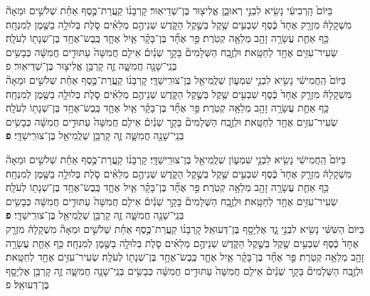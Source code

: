\documentclass[twoside, openany, parskip=half, 11pt]{book}
\begin{document}
\begin{footnotesize}
\begin{multicols}{2}
בַּיּוֹם֙ הָֽרְבִיעִ֔י נָשִׂ֖יא לִבְנֵ֣י רְאוּבֵ֑ן אֱלִיצ֖וּר בֶּן־שְׁדֵיאֽוּר׃ קָרְבָּנ֜וֹ קַֽעֲרַת־כֶּ֣סֶף אַחַ֗ת שְׁלֹשִׁ֣ים וּמֵאָה֘ מִשְׁקָלָהּ֒ מִזְרָ֤ק אֶחָד֙ כֶּ֔סֶף שִׁבְעִ֥ים שֶׁ֖קֶל בְּשֶׁ֣קֶל הַקֹּ֑דֶשׁ שְׁנֵיהֶ֣ם מְלֵאִ֗ים סֹ֛לֶת בְּלוּלָ֥ה בַשֶּׁ֖מֶן לְמִנְחָֽה׃ כַּ֥ף אַחַ֛ת עֲשָׂרָ֥ה זָהָ֖ב מְלֵאָ֥ה קְטֹֽרֶת׃   פַּ֣ר אֶחָ֞ד בֶּן־בָּקָ֗ר אַ֧יִל אֶחָ֛ד כֶּֽבֶשׂ־אֶחָ֥ד בֶּן־שְׁנָת֖וֹ לְעֹלָֽה׃ שְׂעִיר־עִזִּ֥ים אֶחָ֖ד לְחַטָּֽאת׃ וּלְזֶ֣בַֽח הַשְּׁלָמִים֘ בָּקָ֣ר שְׁנַ֒יִם֒ אֵילִ֤ם חֲמִשָּׁה֙ עַתּוּדִ֣ים חֲמִשָּׁ֔ה כְּבָשִׂ֥ים בְּנֵֽי־שָׁנָ֖ה חֲמִשָּׁ֑ה זֶ֛ה קָרְבַּ֥ן אֱלִיצ֖וּר בֶּן־שְׁדֵיאֽוּר׃ פ\\
  בַּיּוֹם֙ הַֽחֲמִישִׁ֔י נָשִׂ֖יא לִבְנֵ֣י שִׁמְע֑וֹן שְׁלֻֽמִיאֵ֖ל בֶּן־צוּרִֽישַׁדָּֽי׃ קָרְבָּנ֜וֹ קַֽעֲרַת־כֶּ֣סֶף אַחַ֗ת שְׁלֹשִׁ֣ים וּמֵאָה֘ מִשְׁקָלָהּ֒ מִזְרָ֤ק אֶחָד֙ כֶּ֔סֶף שִׁבְעִ֥ים שֶׁ֖קֶל בְּשֶׁ֣קֶל הַקֹּ֑דֶשׁ שְׁנֵיהֶ֣ם מְלֵאִ֗ים סֹ֛לֶת בְּלוּלָ֥ה בַשֶּׁ֖מֶן לְמִנְחָֽה׃ כַּ֥ף אַחַ֛ת עֲשָׂרָ֥ה זָהָ֖ב מְלֵאָ֥ה קְטֹֽרֶת׃ פַּ֣ר אֶחָ֞ד בֶּן־בָּקָ֗ר אַ֧יִל אֶחָ֛ד כֶּֽבֶשׂ־אֶחָ֥ד בֶּן־שְׁנָת֖וֹ לְעֹלָֽה׃ שְׂעִיר־עִזִּ֥ים אֶחָ֖ד לְחַטָּֽאת׃ וּלְזֶ֣בַֽח הַשְּׁלָמִים֘ בָּקָ֣ר שְׁנַ֒יִם֒ אֵילִ֤ם חֲמִשָּׁה֙ עַתּוּדִ֣ים חֲמִשָּׁ֔ה כְּבָשִׂ֥ים בְּנֵֽי־שָׁנָ֖ה חֲמִשָּׁ֑ה זֶ֛ה קָרְבַּ֥ן שְׁלֻֽמִיאֵ֖ל בֶּן־צוּרִֽישַׁדָּֽי׃ \textbf{פ}  


בַּיּוֹם֙ הַֽחֲמִישִׁ֔י נָשִׂ֖יא לִבְנֵ֣י שִׁמְע֑וֹן שְׁלֻֽמִיאֵ֖ל בֶּן־צוּרִֽישַׁדָּֽי׃ קָרְבָּנ֜וֹ קַֽעֲרַת־כֶּ֣סֶף אַחַ֗ת שְׁלֹשִׁ֣ים וּמֵאָה֘ מִשְׁקָלָהּ֒ מִזְרָ֤ק אֶחָד֙ כֶּ֔סֶף שִׁבְעִ֥ים שֶׁ֖קֶל בְּשֶׁ֣קֶל הַקֹּ֑דֶשׁ שְׁנֵיהֶ֣ם מְלֵאִ֗ים סֹ֛לֶת בְּלוּלָ֥ה בַשֶּׁ֖מֶן לְמִנְחָֽה׃ כַּ֥ף אַחַ֛ת עֲשָׂרָ֥ה זָהָ֖ב מְלֵאָ֥ה קְטֹֽרֶת׃   פַּ֣ר אֶחָ֞ד בֶּן־בָּקָ֗ר אַ֧יִל אֶחָ֛ד כֶּֽבֶשׂ־אֶחָ֥ד בֶּן־שְׁנָת֖וֹ לְעֹלָֽה׃ שְׂעִיר־עִזִּ֥ים אֶחָ֖ד לְחַטָּֽאת׃ וּלְזֶ֣בַֽח הַשְּׁלָמִים֘ בָּקָ֣ר שְׁנַ֒יִם֒ אֵילִ֤ם חֲמִשָּׁה֙ עַתּוּדִ֣ים חֲמִשָּׁ֔ה כְּבָשִׂ֥ים בְּנֵֽי־שָׁנָ֖ה חֲמִשָּׁ֑ה זֶ֛ה קָרְבַּ֥ן שְׁלֻֽמִיאֵ֖ל בֶּן־צוּרִֽישַׁדָּֽי׃ \textbf{פ} \\ 
  בַּיּוֹם֙ הַשִּׁשִּׁ֔י נָשִׂ֖יא לִבְנֵ֣י גָ֑ד אֶלְיָסָ֖ף בֶּן־דְּעוּאֵֽל׃ קָרְבָּנ֜וֹ קַֽעֲרַת־כֶּ֣סֶף אַחַ֗ת שְׁלֹשִׁ֣ים וּמֵאָה֘ מִשְׁקָלָהּ֒ מִזְרָ֤ק אֶחָד֙ כֶּ֔סֶף שִׁבְעִ֥ים שֶׁ֖קֶל בְּשֶׁ֣קֶל הַקֹּ֑דֶשׁ שְׁנֵיהֶ֣ם מְלֵאִ֗ים סֹ֛לֶת בְּלוּלָ֥ה בַשֶּׁ֖מֶן לְמִנְחָֽה׃ כַּ֥ף אַחַ֛ת עֲשָׂרָ֥ה זָהָ֖ב מְלֵאָ֥ה קְטֹֽרֶת׃ פַּ֣ר אֶחָ֞ד בֶּן־בָּקָ֗ר אַ֧יִל אֶחָ֛ד כֶּֽבֶשׂ־אֶחָ֥ד בֶּן־שְׁנָת֖וֹ לְעֹלָֽה׃ שְׂעִיר־עִזִּ֥ים אֶחָ֖ד לְחַטָּֽאת׃ וּלְזֶ֣בַֽח הַשְּׁלָמִים֘ בָּקָ֣ר שְׁנַ֒יִם֒ אֵילִ֤ם חֲמִשָּׁה֙ עַתּוּדִ֣ים חֲמִשָּׁ֔ה כְּבָשִׂ֥ים בְּנֵֽי־שָׁנָ֖ה חֲמִשָּׁ֑ה זֶ֛ה קָרְבַּ֥ן אֶלְיָסָ֖ף בֶּן־דְּעוּאֵֽל׃ פ



\end{multicols}
\end{footnotesize}
\end{document}
